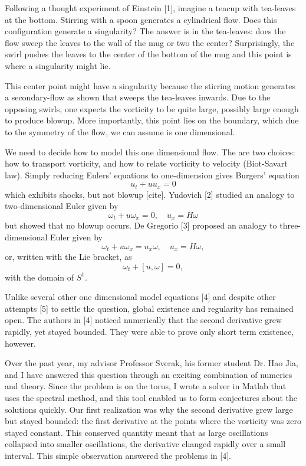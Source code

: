 \documentclass[12pt]{article}
\begin{document}
Following a thought experiment of Einstein [1], imagine a teacup with tea-leaves at the bottom. Stirring with a spoon generates a cylindrical flow. Does this configuration generate a singularity? The answer is in the tea-leaves: does the flow sweep the leaves to the wall of the mug or two the center? Surprisingly, the swirl pushes the leaves to the center of the bottom of the mug and this point is where a singularity might lie.

This center point might have a singularity because the stirring motion generates a secondary-flow as shown that sweeps the tea-leaves inwards. Due to the opposing swirls, one expects the vorticity to be quite large, possibly large enough to produce blowup. More importantly, this point lies on the boundary, which due to the symmetry of the flow, we can assume is one dimensional.

We need to decide how to model this one dimensional flow. The are two choices: how to transport vorticity, and how to relate vorticity to velocity (Biot-Savart law). Simply reducing Eulers' equations to one-dimension gives Burgers' equation
\[
	u_t + u u_x = 0	
\]
which exhibits shocks, but not blowup [cite]. Yudovich [2] studied an analogy to two-dimensional Euler given by
\[
	\omega_t + u \omega_x = 0, \quad u_x = H \omega
\]
but showed that no blowup occurs. De Gregorio [3] proposed an analogy to three-dimensional Euler given by
\[
	\omega_t + u \omega_x = u_x \omega, \quad u_x = H \omega,
\]
or, written with the Lie bracket, as
\[
	\omega_t + [u, \omega] = 0,
\]
with the domain of $S^1$.

Unlike several other one dimensional model equations [4] and despite other attempts [5] to settle the question, global existence and regularity has remained open. The authors in [4] noticed numerically that the second derivative grew rapidly, yet stayed bounded. They were able to prove only short term existence, however.

Over the past year, my advisor Professor Sverak, his former student Dr. Hao Jia, and I have answered this question through an exciting combination of numerics and theory. Since the problem is on the torus, I wrote a solver in Matlab that uses the spectral method, and this tool enabled us to form conjectures about the solutions quickly. Our first realization was why the second derivative grew large but stayed bounded: the first derivative at the points where the vorticity was zero stayed constant. This conserved quantity meant that as large oscillations collapsed into smaller oscillations, the derivative changed rapidly over a small interval. This simple observation answered the problems in [4].
\end{document}
